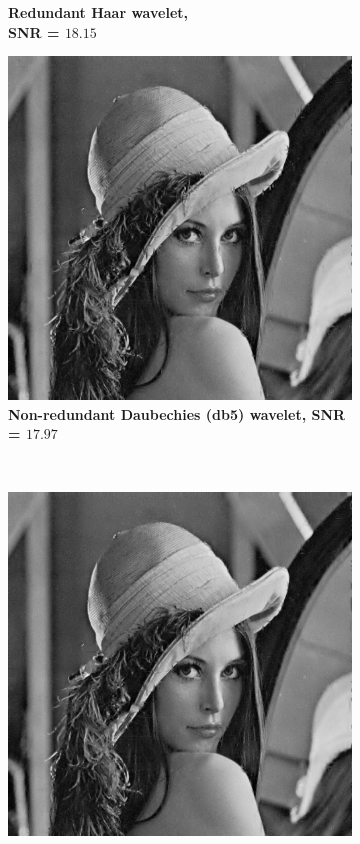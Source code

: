 \begin{figure}
\begin{subfigure}[b]{0.4\textwidth}
        \caption{\textbf{Redundant Haar wavelet, \\ SNR = $\mathbf{18.15}$} }
        \label{fig:matti_fig_rwt_haar}
    \end{subfigure}
    \begin{subfigure}[b]{0.4\textwidth}
        \includegraphics[width=\textwidth]{../src/inpainting/vraag_2_3_wt_db5}
        \caption{\textbf{Non-redundant Daubechies (db5) wavelet,  SNR = $\mathbf{17.97}$} }
        \label{fig:matti_fig_wt_db5}
    \end{subfigure}
    ~ %
    \begin{subfigure}[b]{0.4\textwidth}
        \includegraphics[width=\textwidth]{../src/inpainting/vraag_2_3_rwt_db5}

\end{subfigure}
\end{figure}
